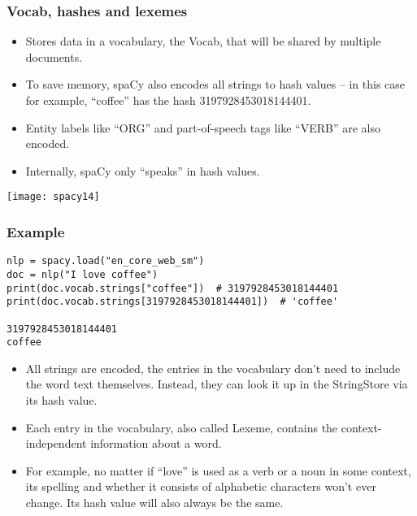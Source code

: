 \begin{frame}[fragile]\frametitle{Vocab, hashes and lexemes}
  \begin{itemize}
    \item Stores data in a vocabulary, the Vocab, that will be shared by multiple documents. 
		\item To save memory, spaCy also encodes all strings to hash values – in this case for example, “coffee” has the hash 3197928453018144401. 
		\item Entity labels like “ORG” and part-of-speech tags like “VERB” are also encoded. 
		\item Internally, spaCy only “speaks” in hash values.
  \end{itemize}
	
	\begin{center}
\texttt{[image: spacy14]}
\end{center}
	
\end{frame}

\begin{frame}[fragile]\frametitle{Example}

\begin{lstlisting}
nlp = spacy.load("en_core_web_sm")
doc = nlp("I love coffee")
print(doc.vocab.strings["coffee"])  # 3197928453018144401
print(doc.vocab.strings[3197928453018144401])  # 'coffee'

3197928453018144401
coffee
\end{lstlisting}

  \begin{itemize}
    \item All strings are encoded, the entries in the vocabulary don't need to include the word text themselves. Instead, they can look it up in the StringStore via its hash value. 
		\item Each entry in the vocabulary, also called Lexeme, contains the context-independent information about a word. 
		\item For example, no matter if “love” is used as a verb or a noun in some context, its spelling and whether it consists of alphabetic characters won't ever change. Its hash value will also always be the same.
  \end{itemize}


\end{frame}

